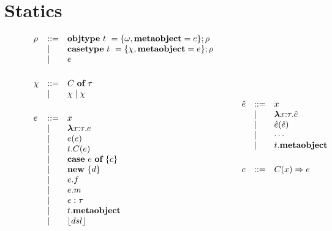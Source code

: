 \section{Statics}

\begin{figure}
\centering
\[
\begin{array}{lll}
\rho & \bnfdef & \keyw{objtype}~ t~ = \{ \omega, \keyw{metaobject}=e \}; \rho \\
     & \bnfalt & \keyw{casetype}~ t~ = \{ \chi, \keyw{metaobject}=e \}; \rho\\
     & \bnfalt & e\\
     \\[1ex]
\chi & \bnfdef & C~\keyw{of}~\tau\\
     & \bnfalt & \chi \bnfalt \chi \\
\\[1ex]
e    & \bnfdef & x \\
     & \bnfalt & \boldsymbol\lambda x{:}\tau . e \\ %
     & \bnfalt & e(e) \\
     & \bnfalt & t.C(e) \\
     & \bnfalt & \keyw{case}~e~\keyw{of}~\{ c \} \\
     & \bnfalt & \keyw{new}~ \{ d \}\\
     & \bnfalt & e.f \\
     & \bnfalt & e.m \\
     & \bnfalt & e : \tau\\
     & \bnfalt & t.\keyw{metaobject}\\
     & \bnfalt & \lfloor dsl \rfloor \\
\\[1ex]	 
\end{array}
\begin{array}{lll}
~~~~
\end{array}
\begin{array}{lll}
\hat{e}    & \bnfdef & x \\
     & \bnfalt & \boldsymbol\lambda x{:}\tau . \hat{e} \\ %
     & \bnfalt & \hat{e}(\hat{e}) \\
     & \bnfalt & \cdots \\
     & \bnfalt & t.\keyw{metaobject}\\
\\[1ex]
c    & \bnfdef & C(x) \Rightarrow e\\

\end{array}\]
\end{figure}
